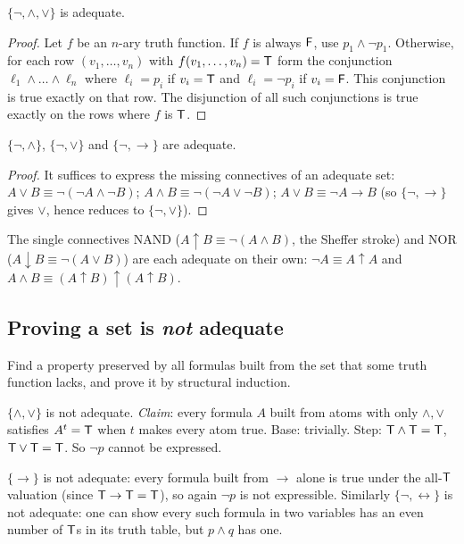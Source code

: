 \begin{theorem}
$\{\neg,\land,\lor\}$ is adequate.
\end{theorem}
\begin{proof}
Let $f$ be an $n$-ary truth function. If $f$ is always $\mathsf{F}$, use $p_1\land\neg p_1$.
Otherwise, for each row $(v_1,\dots,v_n)$ with $f(v_1,\dots,v_n)=\mathsf{T}$ form the conjunction
$\ell_1\land\dots\land\ell_n$ where $\ell_i=p_i$ if $v_i=\mathsf{T}$ and $\ell_i=\neg p_i$ if
$v_i=\mathsf{F}$. This conjunction is true exactly on that row. The disjunction of all such
conjunctions is true exactly on the rows where $f$ is $\mathsf{T}$.
\end{proof}

\begin{corollary}
$\{\neg,\land\}$, $\{\neg,\lor\}$ and $\{\neg,\to\}$ are adequate.
\end{corollary}
\begin{proof}
It suffices to express the missing connectives of an adequate set:
$A\lor B\equiv\neg(\neg A\land\neg B)$;\quad
$A\land B\equiv\neg(\neg A\lor\neg B)$;\quad
$A\lor B\equiv\neg A\to B$ (so $\{\neg,\to\}$ gives $\lor$, hence reduces to
$\{\neg,\lor\}$).
\end{proof}

The single connectives NAND ($A\uparrow B \equiv \neg(A\land B)$, the Sheffer stroke) and
NOR ($A\downarrow B\equiv\neg(A\lor B)$) are each adequate on their own:
$\neg A\equiv A\uparrow A$ and $A\land B\equiv(A\uparrow B)\uparrow(A\uparrow B)$.

\subsection{Proving a set is \emph{not} adequate}

Find a property preserved by all formulas built from the set that some truth function
lacks, and prove it by structural induction.

\begin{example}
$\{\land,\lor\}$ is not adequate. \emph{Claim}: every formula $A$ built from atoms with
only $\land,\lor$ satisfies $A^t=\mathsf{T}$ when $t$ makes every atom true. Base: trivially.
Step: $\mathsf{T}\land\mathsf{T}=\mathsf{T}$, $\mathsf{T}\lor\mathsf{T}=\mathsf{T}$. So $\neg p$ cannot be expressed.
\end{example}

\begin{example}
$\{\to\}$ is not adequate: every formula built from $\to$ alone is true under the
all-$\mathsf{T}$ valuation (since $\mathsf{T}\to\mathsf{T}=\mathsf{T}$), so again $\neg p$ is not expressible.
Similarly $\{\neg,\leftrightarrow\}$ is not adequate: one can show every such formula in
two variables has an even number of $\mathsf{T}$s in its truth table, but $p\land q$ has one.
\end{example}

